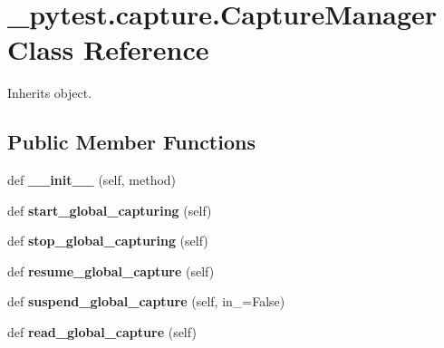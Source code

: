 \hypertarget{class__pytest_1_1capture_1_1_capture_manager}{}\section{\+\_\+pytest.\+capture.\+Capture\+Manager Class Reference}
\label{class__pytest_1_1capture_1_1_capture_manager}


Inherits object.

\subsection*{Public Member Functions}
\begin{DoxyCompactItemize}
\item 
\mbox{\label{class__pytest_1_1capture_1_1_capture_manager_a821619fb210004c2203d89437558acaa}} 
def {\bfseries \+\_\+\+\_\+init\+\_\+\+\_\+} (self, method)
\item 
\mbox{\label{class__pytest_1_1capture_1_1_capture_manager_a5b023379942a61509616160b815a22ee}} 
def {\bfseries start\+\_\+global\+\_\+capturing} (self)
\item 
\mbox{\label{class__pytest_1_1capture_1_1_capture_manager_a9ba4a609712e0ae348d8bcb650e8ae47}} 
def {\bfseries stop\+\_\+global\+\_\+capturing} (self)
\item 
\mbox{\label{class__pytest_1_1capture_1_1_capture_manager_a721b063d0ebbbd46ecae433f7b1a5f47}} 
def {\bfseries resume\+\_\+global\+\_\+capture} (self)
\item 
\mbox{\label{class__pytest_1_1capture_1_1_capture_manager_ae3b624e4040f335acccb02d2e5c676c1}} 
def {\bfseries suspend\+\_\+global\+\_\+capture} (self, in\+\_\+=False)
\item 
\mbox{\label{class__pytest_1_1capture_1_1_capture_manager_a9a33a21b8ed2eb7455414e054e49670e}} 
def {\bfseries read\+\_\+global\+\_\+capture} (self)
\item 

\end{DoxyCompactItemize}
